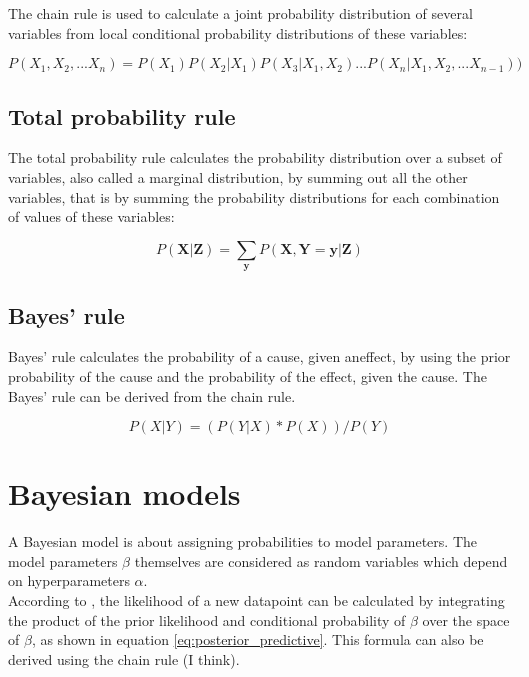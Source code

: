 \documentclass{article}
\begin{document}
The chain rule is used to calculate a \gls{joint probability distribution} of several variables from local \gls{conditional probability distribution}s of these variables:

\begin{equation}
  P(X_1 ,X_2 ,...X_n ) = P(X_1 )P(X_2 | X_1 )P(X_3 | X_1 ,X_2 )...P(X_n | X_1 ,X_2 ,...X_{n-1}) )
\end{equation}

\subsection{Total probability rule}

The total probability rule calculates the probability distribution over a subset of variables, also called a \gls{marginal distribution}, by summing out all the other variables, that is by summing the probability distributions for each combination of values of these variables:

\begin{equation}
P(\boldsymbol X |\boldsymbol Z ) = \sum_{\boldsymbol y}   P(\boldsymbol X ,\boldsymbol Y =\boldsymbol y |\boldsymbol Z )
\end{equation} 

\subsection{Bayes' rule}

Bayes' rule calculates the probability of a cause, given aneffect, by using the prior probability of the cause and the probability of the effect, given the cause. The Bayes' rule can be derived from the chain rule.

\begin{equation}
P(X|Y) = ( P(Y|X) * P(X) ) / P(Y)
\end{equation}

\section{Bayesian models}

A Bayesian model is about assigning probabilities to model parameters. The model parameters $\beta$ themselves are considered as random variables which depend on hyperparameters $\alpha$.
\\
According to \cite{Wang2018}, the likelihood of a new datapoint can be calculated by integrating the product of the prior likelihood and conditional probability of $\beta$ over the space of $\beta$, as shown in equation \ref{eq:posterior_predictive}. This formula can also be derived using the chain rule (I think).
\end{document}
